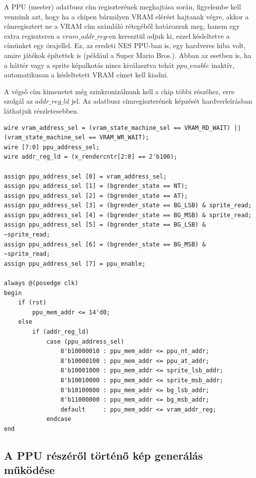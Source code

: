 	A PPU (mester) adatbusz cím regiszterének meghajtása során, figyelembe kell vennünk azt, hogy ha a chipen bármilyen VRAM elérést hajtanak végre, akkor a címregisztert ne a VRAM cím számláló rétegéből határozzuk meg, hanem egy extra regiszteren a $vram\_addr\_reg$-en keresztül adjuk ki, ezzel késleltetve a címünket egy órajellel. Ez, az eredeti NES PPU-ban is, egy hardveres hiba volt, amire játékok építettek is (például a Super Mario Bros.). Abban az esetben is, ha a háttér vagy a sprite képalkotás nincs kiválasztva tehát $ppu\_enable$ inaktív, automatikusan a késleltetett VRAM címet kell kiadni. 
	
	A végső cím kimenetet még szinkronizálnunk kell a chip többi részéhez, erre szolgál az $addr\_reg\_ld$ jel. Az adatbusz címregiszterének képzését  hardverleírásban láthatjuk részletesebben.

\begin{lstlisting}[caption={PPU master adatbusz címregiszterének meghajtása és időzítése}, label={code:PPU-master-databus-addr}, style=prettyverilog]
wire vram_address_sel = (vram_state_machine_sel == VRAM_RD_WAIT) || (vram_state_machine_sel == VRAM_WR_WAIT);
wire [7:0] ppu_address_sel;
wire addr_reg_ld = (x_rendercntr[2:0] == 2'b100);

assign ppu_address_sel [0] = vram_address_sel;
assign ppu_address_sel [1] = (bgrender_state == NT);
assign ppu_address_sel [2] = (bgrender_state == AT);
assign ppu_address_sel [3] = (bgrender_state == BG_LSB) & sprite_read;
assign ppu_address_sel [4] = (bgrender_state == BG_MSB) & sprite_read;
assign ppu_address_sel [5] = (bgrender_state == BG_LSB) & ~sprite_read;
assign ppu_address_sel [6] = (bgrender_state == BG_MSB) & ~sprite_read;
assign ppu_address_sel [7] = ppu_enable;

always @(posedge clk) 
begin
	if (rst)
		ppu_mem_addr <= 14'd0;
	else
		if (addr_reg_ld)
			case (ppu_address_sel)
				8'b10000010 : ppu_mem_addr <= ppu_nt_addr;
				8'b10000100 : ppu_mem_addr <= ppu_at_addr;
				8'b10001000 : ppu_mem_addr <= sprite_lsb_addr;
				8'b10010000 : ppu_mem_addr <= sprite_msb_addr;
				8'b10100000 : ppu_mem_addr <= bg_lsb_addr;
				8'b11000000 : ppu_mem_addr <= bg_msb_addr;
				default		: ppu_mem_addr <= vram_addr_reg;
			endcase
end\end{lstlisting}

	\subsection{A PPU részéről történő kép generálás működése}
	
